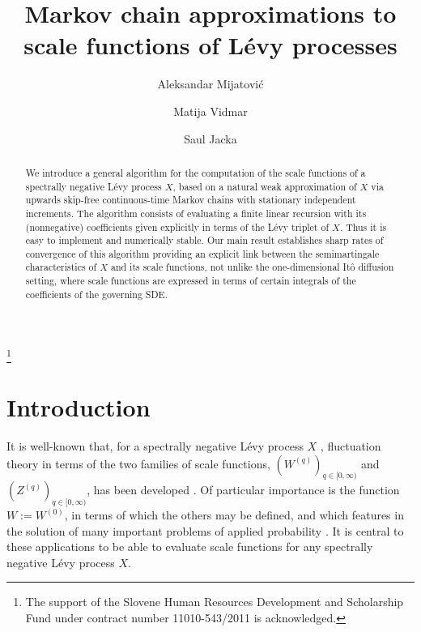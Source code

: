 \documentclass[pdftex,oneside,11pt,reqno]{amsart}
\theoremstyle{definition}
\theoremstyle{theorem}
\theoremstyle{remark}
\numberwithin{equation}{section}
\numberwithin{definition}{section}
\begin{document}
\title{Markov chain approximations to scale functions of L\'evy processes}

\author{Aleksandar Mijatovi\'{c}}
\address{Department of Mathematics, Imperial College London, UK}

\author{Matija Vidmar}
\address{Department of Statistics, University of Warwick, UK}

\author{Saul Jacka}
\address{Department of Statistics, University of Warwick, UK}

\thanks{The support of the Slovene Human Resources Development and Scholarship Fund under contract number 11010-543/2011 is acknowledged.}

\begin{abstract}
We introduce a general algorithm for the computation of the
scale functions of a spectrally negative L\'evy process $X$,
based on a natural weak approximation of $X$ via upwards
skip-free continuous-time Markov chains with stationary
independent increments. The algorithm consists of evaluating a finite linear 
recursion with its (nonnegative) coefficients given explicitly in terms 
of the L\'evy triplet of $X$.
Thus it is easy to implement and numerically stable.
Our main result establishes sharp rates of convergence 
of this algorithm providing an explicit link between the semimartingale
characteristics of $X$ and its scale functions, not unlike the
one-dimensional It\^o diffusion setting, where scale functions are expressed
in terms of certain integrals of the coefficients of the governing
SDE.
\end{abstract}



\maketitle

\section{Introduction}\label{section:Introduction}
It is well-known that, for a spectrally negative L\'evy process $X$ \cite[Chapter~VII]{bertoin} \cite[Section~9.46]{sato}, fluctuation theory in terms of the two families of scale functions, $({W^{(q)}})_{q\in [0,\infty)}$ and $({Z^{(q)}})_{q\in[0,\infty)}$, has been developed \cite[Section~8.2]{kyprianou}. Of particular importance is the function ${W}:=W^{(0)}$, in terms of which the others may be defined, and which features in the solution of many important problems of applied probability \cite[Section 1.2]{kuznetsovkyprianourivero}. It is central to these applications to be able to evaluate scale functions for any spectrally negative L\'evy 
process $X$.
\end{document}
